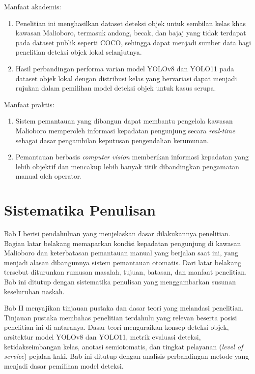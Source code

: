 \noindent Manfaat akademis:

\begin{enumerate}
    \item Penelitian ini menghasilkan dataset deteksi objek untuk sembilan kelas khas kawasan Malioboro, termasuk andong, becak, dan bajaj yang tidak terdapat pada dataset publik seperti COCO, sehingga dapat menjadi sumber data bagi penelitian deteksi objek lokal selanjutnya.
    \item Hasil perbandingan performa varian model YOLOv8 dan YOLO11 pada dataset objek lokal dengan distribusi kelas yang bervariasi dapat menjadi rujukan dalam pemilihan model deteksi objek untuk kasus serupa.
\end{enumerate}

\noindent Manfaat praktis:

\begin{enumerate}
    \item Sistem pemantauan yang dibangun dapat membantu pengelola kawasan Malioboro memperoleh informasi kepadatan pengunjung secara \textit{real-time} sebagai dasar pengambilan keputusan pengendalian kerumunan.
    \item Pemantauan berbasis \textit{computer vision} memberikan informasi kepadatan yang lebih objektif dan mencakup lebih banyak titik dibandingkan pengamatan manual oleh operator.
\end{enumerate}

\section{Sistematika Penulisan}

Bab I berisi pendahuluan yang menjelaskan dasar dilakukannya penelitian. Bagian latar 
belakang memaparkan kondisi kepadatan pengunjung di kawasan Malioboro dan keterbatasan 
pemantauan manual yang berjalan saat ini, yang menjadi alasan dibangunnya sistem 
pemantauan otomatis. Dari latar belakang tersebut diturunkan rumusan masalah, tujuan, 
batasan, dan manfaat penelitian. Bab ini ditutup dengan sistematika penulisan yang 
menggambarkan susunan keseluruhan naskah.

Bab II menyajikan tinjauan pustaka dan dasar teori yang melandasi penelitian. Tinjauan 
pustaka membahas penelitian terdahulu yang relevan beserta posisi penelitian ini di 
antaranya. Dasar teori menguraikan konsep deteksi objek, arsitektur model YOLOv8 dan 
YOLO11, metrik evaluasi deteksi, ketidakseimbangan kelas, anotasi semiotomatis, dan 
tingkat pelayanan (\textit{level of service}) pejalan kaki. Bab ini ditutup dengan 
analisis perbandingan metode yang menjadi dasar pemilihan model deteksi.

